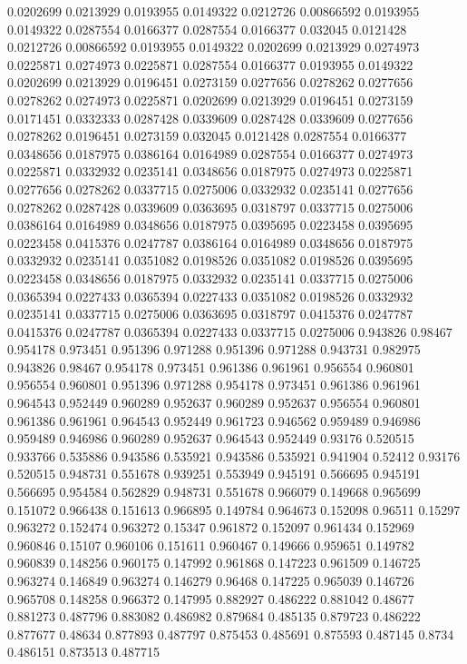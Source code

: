 0.0202699 0.0213929
0.0193955 0.0149322
0.0212726 0.00866592
0.0193955 0.0149322
0.0287554 0.0166377
0.0287554 0.0166377
0.032045 0.0121428
0.0212726 0.00866592
0.0193955 0.0149322
0.0202699 0.0213929
0.0274973 0.0225871
0.0274973 0.0225871
0.0287554 0.0166377
0.0193955 0.0149322
0.0202699 0.0213929
0.0196451 0.0273159
0.0277656 0.0278262
0.0277656 0.0278262
0.0274973 0.0225871
0.0202699 0.0213929
0.0196451 0.0273159
0.0171451 0.0332333
0.0287428 0.0339609
0.0287428 0.0339609
0.0277656 0.0278262
0.0196451 0.0273159
0.032045 0.0121428
0.0287554 0.0166377
0.0348656 0.0187975
0.0386164 0.0164989
0.0287554 0.0166377
0.0274973 0.0225871
0.0332932 0.0235141
0.0348656 0.0187975
0.0274973 0.0225871
0.0277656 0.0278262
0.0337715 0.0275006
0.0332932 0.0235141
0.0277656 0.0278262
0.0287428 0.0339609
0.0363695 0.0318797
0.0337715 0.0275006
0.0386164 0.0164989
0.0348656 0.0187975
0.0395695 0.0223458
0.0395695 0.0223458
0.0415376 0.0247787
0.0386164 0.0164989
0.0348656 0.0187975
0.0332932 0.0235141
0.0351082 0.0198526
0.0351082 0.0198526
0.0395695 0.0223458
0.0348656 0.0187975
0.0332932 0.0235141
0.0337715 0.0275006
0.0365394 0.0227433
0.0365394 0.0227433
0.0351082 0.0198526
0.0332932 0.0235141
0.0337715 0.0275006
0.0363695 0.0318797
0.0415376 0.0247787
0.0415376 0.0247787
0.0365394 0.0227433
0.0337715 0.0275006
0.943826 0.98467
0.954178 0.973451
0.951396 0.971288
0.951396 0.971288
0.943731 0.982975
0.943826 0.98467
0.954178 0.973451
0.961386 0.961961
0.956554 0.960801
0.956554 0.960801
0.951396 0.971288
0.954178 0.973451
0.961386 0.961961
0.964543 0.952449
0.960289 0.952637
0.960289 0.952637
0.956554 0.960801
0.961386 0.961961
0.964543 0.952449
0.961723 0.946562
0.959489 0.946986
0.959489 0.946986
0.960289 0.952637
0.964543 0.952449
0.93176 0.520515
0.933766 0.535886
0.943586 0.535921
0.943586 0.535921
0.941904 0.52412
0.93176 0.520515
0.948731 0.551678
0.939251 0.553949
0.945191 0.566695
0.945191 0.566695
0.954584 0.562829
0.948731 0.551678
0.966079 0.149668
0.965699 0.151072
0.966438 0.151613
0.966895 0.149784
0.964673 0.152098
0.96511 0.15297
0.963272 0.152474
0.963272 0.15347
0.961872 0.152097
0.961434 0.152969
0.960846 0.15107
0.960106 0.151611
0.960467 0.149666
0.959651 0.149782
0.960839 0.148256
0.960175 0.147992
0.961868 0.147223
0.961509 0.146725
0.963274 0.146849
0.963274 0.146279
0.96468 0.147225
0.965039 0.146726
0.965708 0.148258
0.966372 0.147995
0.882927 0.486222
0.881042 0.48677
0.881273 0.487796
0.883082 0.486982
0.879684 0.485135
0.879723 0.486222
0.877677 0.48634
0.877893 0.487797
0.875453 0.485691
0.875593 0.487145
0.8734 0.486151
0.873513 0.487715
